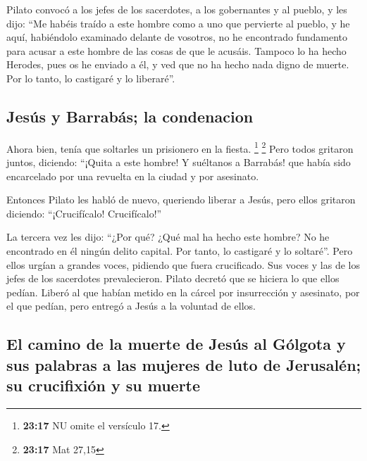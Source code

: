  Pilato convocó a los jefes de los sacerdotes, a los
gobernantes y al pueblo,  y les dijo: ``Me habéis traído
a este hombre como a uno que pervierte al pueblo, y he aquí, habiéndolo
examinado delante de vosotros, no he encontrado fundamento para acusar a
este hombre de las cosas de que le acusáis.  Tampoco lo
ha hecho Herodes, pues os he enviado a él, y ved que no ha hecho nada
digno de muerte.  Por lo tanto, lo castigaré y lo
liberaré''.

\hypertarget{jesuxfas-y-barrabuxe1s-la-condenacion}{%
\subsection{Jesús y Barrabás; la
condenacion}\label{jesuxfas-y-barrabuxe1s-la-condenacion}}

 Ahora bien, tenía que soltarles un prisionero en la
fiesta. \footnote{\textbf{23:17} NU omite el versículo 17.} \footnote{\textbf{23:17}
  Mat 27,15}  Pero todos gritaron juntos, diciendo:
``¡Quita a este hombre! Y suéltanos a Barrabás!  que
había sido encarcelado por una revuelta en la ciudad y por asesinato.

 Entonces Pilato les habló de nuevo, queriendo liberar a
Jesús,  pero ellos gritaron diciendo: ``¡Crucifícalo!
Crucifícalo!''

 La tercera vez les dijo: ``¿Por qué? ¿Qué mal ha hecho
este hombre? No he encontrado en él ningún delito capital. Por tanto, lo
castigaré y lo soltaré''.  Pero ellos urgían a grandes
voces, pidiendo que fuera crucificado. Sus voces y las de los jefes de
los sacerdotes prevalecieron.  Pilato decretó que se
hiciera lo que ellos pedían.  Liberó al que habían metido
en la cárcel por insurrección y asesinato, por el que pedían, pero
entregó a Jesús a la voluntad de ellos.

\hypertarget{el-camino-de-la-muerte-de-jesuxfas-al-guxf3lgota-y-sus-palabras-a-las-mujeres-de-luto-de-jerusaluxe9n-su-crucifixiuxf3n-y-su-muerte}{%
\subsection{El camino de la muerte de Jesús al Gólgota y sus palabras a
las mujeres de luto de Jerusalén; su crucifixión y su
muerte}\label{el-camino-de-la-muerte-de-jesuxfas-al-guxf3lgota-y-sus-palabras-a-las-mujeres-de-luto-de-jerusaluxe9n-su-crucifixiuxf3n-y-su-muerte}}

